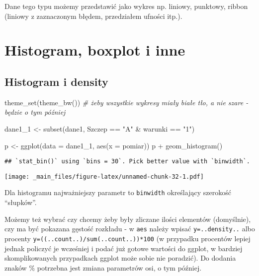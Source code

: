 \documentclass[
]{book}
\newenvironment{Shaded}{\begin{snugshade}}{\end{snugshade}}
\newcommand{\AttributeTok}[1]{\textcolor[rgb]{0.77,0.63,0.00}{#1}}
\newcommand{\CommentTok}[1]{\textcolor[rgb]{0.56,0.35,0.01}{\textit{#1}}}
\newcommand{\FunctionTok}[1]{\textcolor[rgb]{0.00,0.00,0.00}{#1}}
\newcommand{\NormalTok}[1]{#1}
\newcommand{\OtherTok}[1]{\textcolor[rgb]{0.56,0.35,0.01}{#1}}
\newcommand{\SpecialCharTok}[1]{\textcolor[rgb]{0.00,0.00,0.00}{#1}}
\newcommand{\StringTok}[1]{\textcolor[rgb]{0.31,0.60,0.02}{#1}}
\begin{document}
Dane tego typu możemy przedstawić jako wykres np. liniowy, punktowy, ribbon (liniowy z zaznaczonym błędem, przedziałem ufności itp.).

\hypertarget{histogram-boxplot-i-inne}{%
\section{Histogram, boxplot i inne}\label{histogram-boxplot-i-inne}}

\hypertarget{histogram-i-density}{%
\subsection{Histogram i density}\label{histogram-i-density}}

\begin{Shaded}
\begin{Highlighting}[]
\FunctionTok{theme\_set}\NormalTok{(}\FunctionTok{theme\_bw}\NormalTok{()) }\CommentTok{\# żeby wszystkie wykresy miały białe tło, a nie szare {-} będzie o tym później}

\NormalTok{dane1\_1 }\OtherTok{\textless{}{-}} \FunctionTok{subset}\NormalTok{(dane1, Szczep }\SpecialCharTok{==} \StringTok{"A"} \SpecialCharTok{\&}\NormalTok{ warunki }\SpecialCharTok{==} \StringTok{"1"}\NormalTok{)}

\NormalTok{p }\OtherTok{\textless{}{-}} \FunctionTok{ggplot}\NormalTok{(}\AttributeTok{data =}\NormalTok{ dane1\_1, }\FunctionTok{aes}\NormalTok{(}\AttributeTok{x =}\NormalTok{ pomiar))}
\NormalTok{p }\SpecialCharTok{+} \FunctionTok{geom\_histogram}\NormalTok{()}
\end{Highlighting}
\end{Shaded}

\begin{verbatim}
## `stat_bin()` using `bins = 30`. Pick better value with `binwidth`.
\end{verbatim}

\texttt{[image: \_main\_files/figure-latex/unnamed-chunk-32-1.pdf]}

Dla histogramu najważniejszy parametr to \texttt{binwidth} określający szerokość ``słupków''.

Możemy też wybrać czy chcemy żeby były zliczane ilości elementów (domyślnie), czy ma być pokazana gęstość rozkładu - w \texttt{aes} należy wpisać \texttt{y=..density..} albo procenty \texttt{y=((..count..)/sum(..count..))*100} (w przypadku procentów lepiej jednak policzyć je wcześniej i podać już gotowe wartości do ggplot, w bardziej skomplikowanych przypadkach ggplot może sobie nie poradzić). Do dodania znaków \% potrzebna jest zmiana parametrów osi, o tym później.
\end{document}
